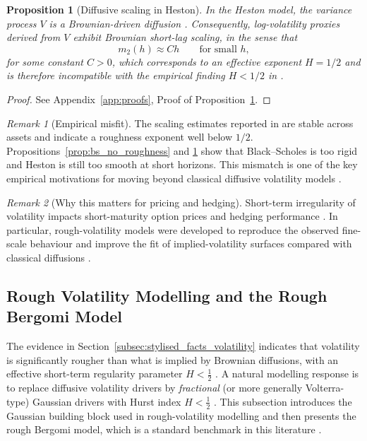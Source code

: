 \documentclass[12pt,a4paper]{article}
\theoremstyle{definition}
\theoremstyle{plain}
\newtheorem{proposition}{Proposition}[section]
\theoremstyle{remark}
\newtheorem{remark}{Remark}[section]
\theoremstyle{plain}
\begin{document}
\begin{proposition}[Diffusive scaling in Heston]
\label{prop:heston_diffusive_scaling}
In the Heston model, the variance process $V$ is a Brownian-driven diffusion \cite{Heston1993}. 
Consequently, log-volatility proxies derived from $V$ exhibit Brownian short-lag scaling, in the sense that
\[
m_2(h)\approx C h
\qquad\text{for small }h,
\]
for some constant $C>0$, which corresponds to an effective exponent $H=1/2$ and is therefore incompatible with the empirical finding $H<1/2$ in \cite{GatheralRough}.
\end{proposition}

\begin{proof}
See Appendix~\ref{app:proofs}, Proof of Proposition~\ref{prop:heston_diffusive_scaling}.
\end{proof}

\begin{remark}[Empirical misfit]
\label{rem:empirical_misfit_classical}
The scaling estimates reported in \cite{GatheralRough} are stable across assets and indicate a roughness exponent well below $1/2$. 
Propositions~\ref{prop:bs_no_roughness} and \ref{prop:heston_diffusive_scaling} show that Black--Scholes is too rigid and Heston is still too smooth at short horizons. 
This mismatch is one of the key empirical motivations for moving beyond classical diffusive volatility models \cite{GatheralRough,BayerFriz2016}.
\end{remark}

\begin{remark}[Why this matters for pricing and hedging]
\label{rem:why_misfit_matters}
Short-term irregularity of volatility impacts short-maturity option prices and hedging performance \cite{GatheralRough}. 
In particular, rough-volatility models were developed to reproduce the observed fine-scale behaviour and improve the fit of implied-volatility surfaces compared with classical diffusions \cite{GatheralRough,BayerFriz2016}. 
\end{remark}

\subsection{Rough Volatility Modelling and the Rough Bergomi Model}
\label{subsec:rough_bergomi_model}

The evidence in Section~\ref{subsec:stylised_facts_volatility} indicates that volatility is significantly rougher than what is implied by Brownian diffusions, with an effective short-term regularity parameter $H<\tfrac12$ \cite{GatheralRough}. 
A natural modelling response is to replace diffusive volatility drivers by \emph{fractional} (or more generally Volterra-type) Gaussian drivers with Hurst index $H<\tfrac12$ \cite{GatheralRough,BayerFriz2016}. 
This subsection introduces the Gaussian building block used in rough-volatility modelling and then presents the rough Bergomi model, which is a standard benchmark in this literature \cite{BayerFriz2016,RoughSurvey}.
\end{document}

